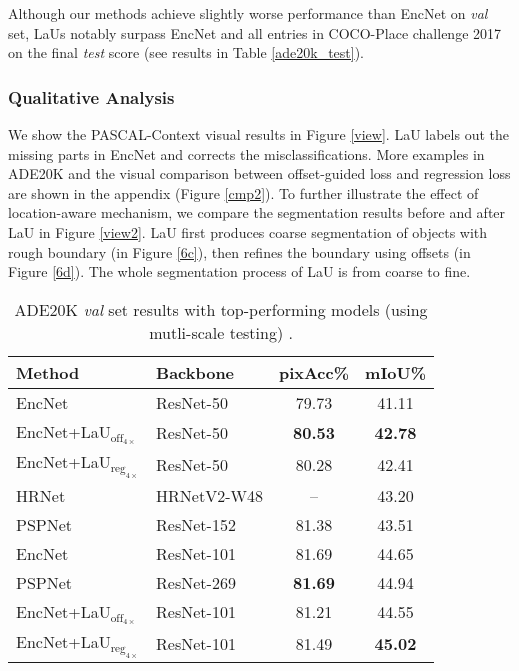 \documentclass[10pt,twocolumn,letterpaper]{article}
\begin{document}
Although our methods achieve slightly worse performance than EncNet on \textit{val} set, LaUs notably surpass EncNet and all entries in COCO-Place challenge 2017 on the final \textit{test} score (see results in Table \ref{ade20k_test}).

\subsubsection{Qualitative Analysis}
We show the PASCAL-Context visual results in Figure \ref{view}. LaU labels out the missing parts in EncNet and corrects the misclassifications. More examples in ADE20K and the visual comparison between offset-guided loss and regression loss are shown in the appendix (Figure \ref{cmp2}). To further illustrate the effect of location-aware mechanism, we compare the segmentation results before and after LaU in Figure \ref{view2}. LaU first produces coarse segmentation of objects with rough boundary (in Figure \ref{6c}), then refines the boundary using offsets (in Figure \ref{6d}). The whole segmentation process of LaU is from coarse to fine.

\begin{table}
  \caption{ADE20K \textit{val} set results with top-performing models (using mutli-scale testing) .}
  \label{sample-table}
  \centering
\begin{tabular}{llcc}
\hline    
Method    & Backbone & pixAcc\%  & mIoU\%\\
\hline  \hline  
EncNet \cite{EncNet} & ResNet-50 & 79.73 & 41.11 \\
EncNet+LaU$_{\text{off}_{4\times}}$ & ResNet-50 & \textbf{80.53} & \textbf{42.78} \\
EncNet+LaU$_{\text{reg}_{4\times}}$ & ResNet-50 & 80.28 & 42.41 \\
\hline
HRNet \cite{HRR} & HRNetV2-W48  & -- & 43.20\\
PSPNet \cite{PSPNet} & ResNet-152 & 81.38 & 43.51\\
EncNet \cite{EncNet} & ResNet-101 & 81.69 & 44.65\\
PSPNet \cite{PSPNet} & ResNet-269 & \textbf{81.69} & 44.94\\
EncNet+LaU$_{\text{off}_{4\times}}$ & ResNet-101 & 81.21 & 44.55 \\
EncNet+LaU$_{\text{reg}_{4\times}}$ & ResNet-101 & 81.49  & \textbf{45.02} \\
\hline  
  \end{tabular}
\label{ade20k_val}
\end{table}
\end{document}
